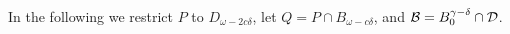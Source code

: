 In the following we restrict $P$ to $D_{\omega-2c\delta}$, let $Q = P\cap B_{\omega - c\delta}$, and ${\mathcal{B}} = B_0^{\gamma-\delta}\cap{\mathcal{D}}$.

%
%
%
